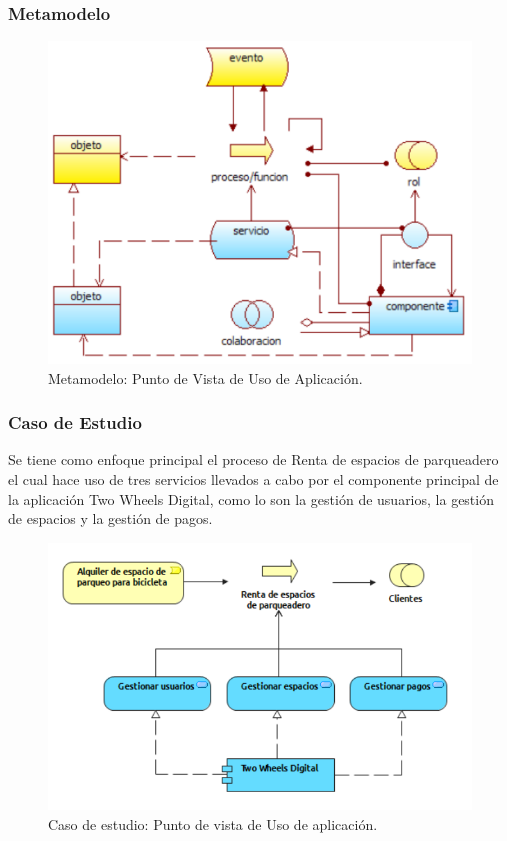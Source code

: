 \subsubsection{Metamodelo}
\begin{figure}[H]
	\centering
	\includegraphics[width=1.0\textwidth]{imagenes/Metamodelos/Aplicacion/meta_uso_aplicacion.png}
	\caption{Metamodelo: Punto de Vista de Uso de Aplicación.}
	\label{fig:gap_analysis}
\end{figure}

\subsubsection{Caso de Estudio}
Se tiene como enfoque principal el proceso de Renta de espacios de parqueadero el cual hace uso de tres servicios llevados a cabo por el componente principal de la aplicación Two Wheels Digital, como lo son la gestión de usuarios, la gestión de espacios y la gestión de pagos.

\begin{figure}[H]
	\centering
	\includegraphics[width=1.0\textwidth]{imagenes/Caso_Estudio/Aplicacion/UsoAplicacion.PDF}
	\caption{Caso de estudio: Punto de vista de Uso de aplicación.}
	\label{fig:gap_analysis}
\end{figure}

